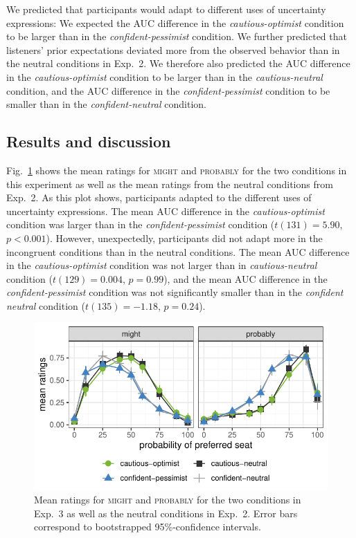 \documentclass[man,floatsintext]{apa6}
\begin{document}
We predicted that participants would adapt to different uses of uncertainty expressions: We expected the AUC difference in the \textit{cautious-optimist} condition to be larger than in the \textit{confident-pessimist} condition. We further predicted that listeners' prior expectations deviated more from the observed behavior than in the neutral conditions in Exp.~2. We therefore also predicted the AUC difference in the \textit{cautious-optimist} condition to be larger than in the \textit{cautious-neutral} condition, and the AUC difference in the \textit{confident-pessimist} condition to be smaller than in the \textit{confident-neutral} condition.

\subsection{Results and discussion}

Fig.~\ref{fig:results-exp3} shows the mean ratings for \textsc{might} and \textsc{probably} for the two conditions in this experiment as well as the mean ratings from the neutral conditions from Exp.~2. As this plot shows, participants adapted to the different uses of uncertainty expressions. The mean AUC difference in the \textit{cautious-optimist} condition was larger than in the \textit{confident-pessimist} condition ($t(131)=5.90$, $p<0.001$). However, unexpectedly, participants did not adapt more in the incongruent conditions than in the neutral conditions. The mean AUC difference in the \textit{cautious-optimist} condition was not larger than in \textit{cautious-neutral} condition ($t(129)=0.004$, $p=0.99$), and the mean AUC difference in the \textit{confident-pessimist} condition was not significantly smaller than in the \textit{confident neutral} condition ($t(135)=-1.18$, $p=0.24$).

\begin{figure}[t]
    \centering
    \includegraphics[width=\columnwidth]{incongruent.pdf}
    \caption{Mean ratings for \textsc{might} and \textsc{probably} for the two conditions in Exp.~3 as well as the neutral conditions in Exp.~2. Error bars correspond to bootstrapped 95\%-confidence intervals.}
    \label{fig:results-exp3}
\end{figure}
\end{document}
